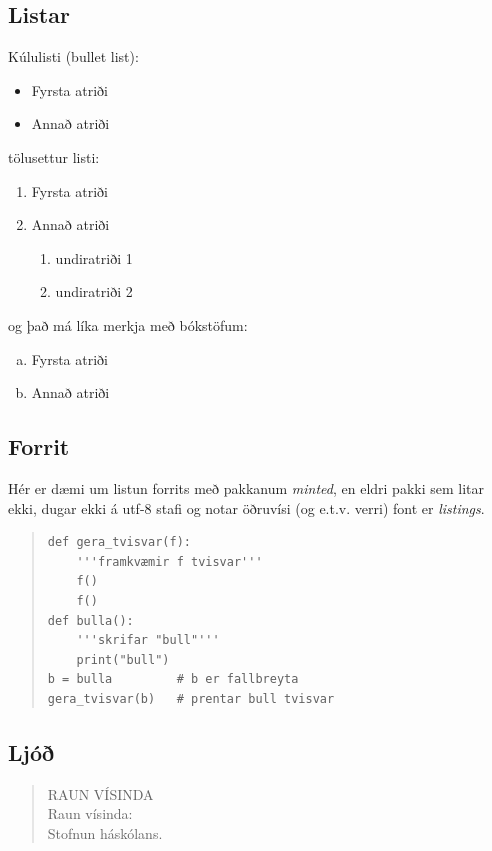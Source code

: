 \documentclass[12pt]{article}    %
\begin{document}
\subsection{Listar}
Kúlulisti (bullet list):
\begin{itemize}
    \item Fyrsta atriði
    \item Annað atriði
\end{itemize}
%
tölusettur listi:
\begin{enumerate}
    \item Fyrsta atriði
    \item Annað atriði
    \begin{enumerate}[1.]
        \item undiratriði 1
        \item undiratriði 2
    \end{enumerate}
\end{enumerate}
%
og það má líka merkja með bókstöfum:
%
\begin{enumerate}[a)]
    \item Fyrsta atriði
    \item Annað atriði
\end{enumerate}

\subsection{Forrit}
Hér er dæmi um listun forrits með pakkanum \textit{minted}, en eldri pakki sem litar ekki, dugar ekki á utf-8 stafi og notar öðruvísi (og e.t.v. verri) font er \textit{listings}.
\begin{quote}           %
\begin{verbatim}
def gera_tvisvar(f):
    '''framkvæmir f tvisvar'''
    f()
    f()
def bulla():
    '''skrifar "bull"'''
    print("bull")
b = bulla         # b er fallbreyta
gera_tvisvar(b)   # prentar bull tvisvar
\end{verbatim}
\end{quote}

\subsection{Ljóð}
\begin{verse}
\textrm{RAUN VÍSINDA} \\[.3em]  %
Raun vísinda:\\
Stofnun háskólans.\\
\hspace{4em}{\footnotesize Dagur Sigurðarson}
\end{verse}
\end{document}

